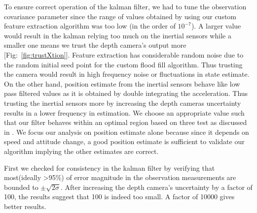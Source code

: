 \documentclass[]{article}
\begin{document}
{To ensure correct operation of the kalman filter, we had to tune the observation covariance parameter since the range of values obtained by using our custom feature extraction algorithm was too low (in the order of $10^{-7}$). A larger value would result in the kalman relying too much on the inertial sensors while a smaller one means we trust the depth camera's output more [Fig:~\ref{fig:trustXtion}]. Feature extraction has considerable random noise due to the random initial seed point for the custom flood fill algorithm. Thus trusting the camera would result in high frequency noise or fluctuations in state estimate. On the other hand, position estimate from the inertial sensors behave like low pass filtered values as it is obtained by double integrating the acceleration. Thus trusting the inertial sensors more by increasing the depth cameras uncertainty results in a lower frequency in estimation. We choose an appropriate value such that our filter behaves within an optimal region based on three test as discussed in \cite{KalmanTuning} . We focus our analysis on position estimate alone because since it depends on speed and attitude change, a good position estimate is sufficient to validate our algorithm implying the other estimates are correct. 

First we checked for consistency in the kalman filter by verifying that most(ideally \textgreater 95\%) of error magnitude in the observation measurements are bounded to $\pm\sqrt{2\sigma}$. After increasing the depth camera's uncertainty by a factor of 100, the results suggest that 100 is indeed too small. A factor of 10000 gives better results.


}
\end{document}

